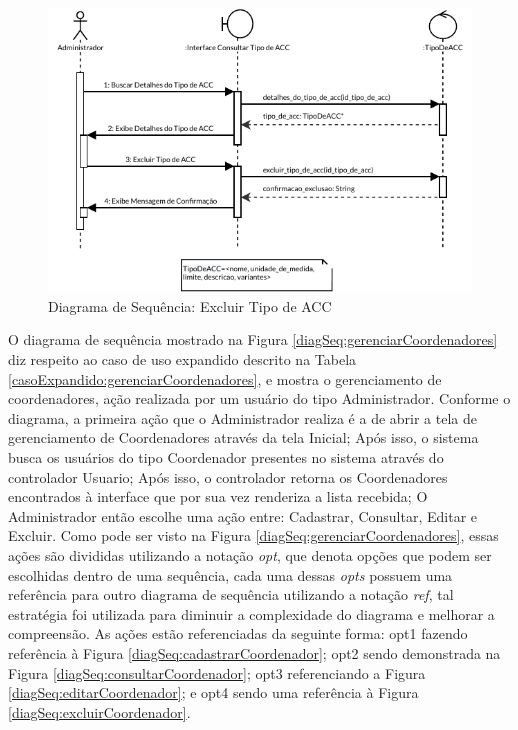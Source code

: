 \begin{figure}[H]
    \centering
    \includegraphics[width=\textwidth]{dados/figuras/Proposta/DiagramasDeSequencia/Gerenciar Tipos de ACC-Excluir Tipo de ACC.pdf}
    \caption{Diagrama de Sequência: Excluir Tipo de ACC}
    \label{diagSeq:excluirTipoDeACC}
\end{figure}

O diagrama de sequência mostrado na Figura \ref{diagSeq:gerenciarCoordenadores} diz respeito ao caso de uso expandido descrito na Tabela \ref{casoExpandido:gerenciarCoordenadores}, e mostra o gerenciamento de coordenadores, ação realizada por um usuário do tipo Administrador. Conforme o diagrama, a primeira ação que o Administrador realiza é a de abrir a tela de gerenciamento de Coordenadores através da tela Inicial; Após isso, o sistema busca os usuários do tipo Coordenador presentes no sistema através do controlador Usuario; Após isso, o controlador retorna os Coordenadores encontrados à interface que por sua vez renderiza a lista recebida; O Administrador então escolhe uma ação entre: Cadastrar, Consultar, Editar e Excluir. Como pode ser visto na Figura \ref{diagSeq:gerenciarCoordenadores}, essas ações são divididas utilizando a notação \textit{opt}, que denota opções que podem ser escolhidas dentro de uma sequência, cada uma dessas \textit{opts} possuem uma referência para outro diagrama de sequência utilizando a notação \textit{ref}, tal estratégia foi utilizada para diminuir a complexidade do diagrama e melhorar a compreensão. As ações estão referenciadas da seguinte forma: opt1 fazendo referência à Figura \ref{diagSeq:cadastrarCoordenador}; opt2 sendo demonstrada na Figura \ref{diagSeq:consultarCoordenador}; opt3 referenciando a Figura \ref{diagSeq:editarCoordenador}; e opt4 sendo uma referência à Figura \ref{diagSeq:excluirCoordenador}.


